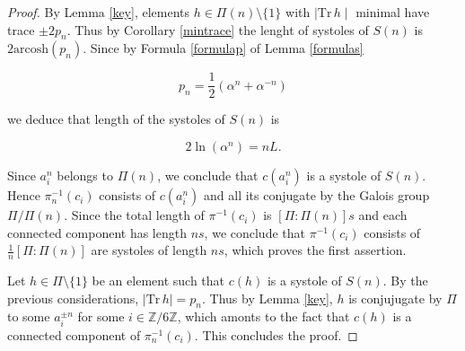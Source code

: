 \documentclass[10pt,a4paper]{amsart}
\newcommand{\Z}{\mathbb{Z}}
\newcommand{\arcosh}{\mathrm{arcosh}}
\newcommand{\Tr}{{\mathrm {Tr}}}
\begin{document}
\begin{proof} By Lemma \ref{key}, elements 
$h\in\Pi(n)\setminus\{1\}$ with $\mid\Tr\,h\mid$ minimal have trace $\pm 2 p_n$. 
Thus by Corollary \ref{mintrace} the lenght of systoles
of $S(n)$ is $2\arcosh(p_n)$. Since by  Formula \ref{formulap}  of Lemma 
\ref{formulas}

$$p_n=\frac{1}{2}(\alpha^n+\alpha^{-n})$$

we deduce that length  of the systoles of $S(n)$ is

$$2\ln(\alpha^n)=nL.$$

Since $a_i^n$ belongs to $\Pi(n)$, we conclude that
$c(a_i^n)$ is a systole of $S(n)$. Hence
$\pi_n^{-1}(c_i)$ consists of $c(a_i^n)$ and all its conjugate by the Galois group $\Pi/\Pi(n)$.
Since the total length of $\pi^{-1}(c_i)$
is $[\Pi:\Pi(n)]s$ and each connected component has length
$ns$, we conclude that
$\pi^{-1}(c_i)$ consists of $\frac{1}{n} [\Pi:\Pi(n)]$ are systoles of length $ns$, which proves the first assertion.

Let $h\in\Pi\setminus\{1\}$ be an element such that
$c(h)$ is a systole of $S(n)$. By the previous considerations, $\mid\Tr\,h\mid=p_n$. Thus 
by Lemma \ref{key}, $h$
is conjujugate by $\Pi$ to some $a_i^{\pm n}$ for
some $i\in\Z/6\Z$, which amonts to the fact that $c(h)$ is a connected component of $\pi_n^{-1}(c_i)$. This concludes
the proof. \end{proof}
\end{document}
